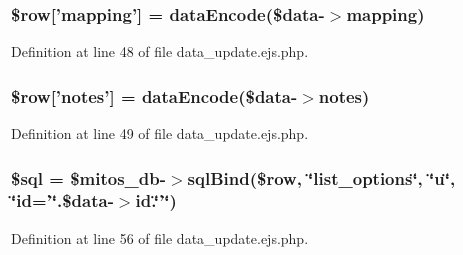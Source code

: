 \hypertarget{administration_2lists_2data__update_8ejs_8php_ad4c649a633b36e8ca62f63391a3279a6}{
\subsubsection[{\$row}]{\setlength{\rightskip}{0pt plus 5cm}\$row\mbox{[}'mapping'\mbox{]} = {\bf data\-Encode}(\$data-\/$>$mapping)}}\label{administration_2lists_2data__update_8ejs_8php_ad4c649a633b36e8ca62f63391a3279a6}


\-Definition at line 48 of file data\-\_\-update.\-ejs.\-php.

\hypertarget{administration_2lists_2data__update_8ejs_8php_a6cd140f95df717cfed217fe478482645}{
\subsubsection[{\$row}]{\setlength{\rightskip}{0pt plus 5cm}\$row\mbox{[}'notes'\mbox{]} = {\bf data\-Encode}(\$data-\/$>$notes)}}\label{administration_2lists_2data__update_8ejs_8php_a6cd140f95df717cfed217fe478482645}


\-Definition at line 49 of file data\-\_\-update.\-ejs.\-php.

\hypertarget{administration_2lists_2data__update_8ejs_8php_a047170d6020a882807665812a27e2525}{
\subsubsection[{\$sql}]{\setlength{\rightskip}{0pt plus 5cm}\$sql = \$mitos\-\_\-db-\/$>$sql\-Bind(\$row, \char`\"{}list\-\_\-options\char`\"{}, \char`\"{}u\char`\"{}, \char`\"{}id='\char`\"{}.\$data-\/$>$id.\char`\"{}'\char`\"{})}}\label{administration_2lists_2data__update_8ejs_8php_a047170d6020a882807665812a27e2525}


\-Definition at line 56 of file data\-\_\-update.\-ejs.\-php.

